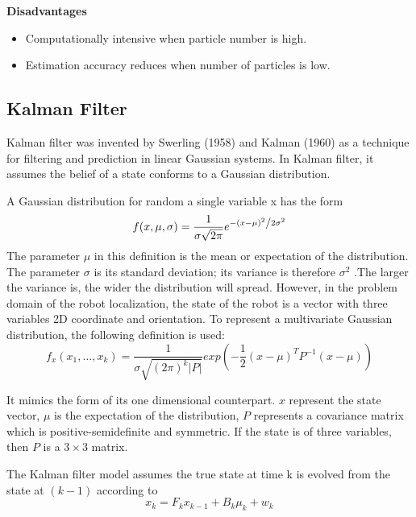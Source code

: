 \noindent\textbf{Disadvantages}

\begin{itemize}
  \item  Computationally intensive when particle number is high.
  \item  Estimation accuracy reduces when number of particles is low.
\end{itemize}


\subsection{Kalman Filter}\label{sub:kalman}
Kalman filter was invented by Swerling (1958) and Kalman (1960) as a technique for filtering and prediction in linear Gaussian systems. In Kalman filter, it assumes the belief of a state conforms to a Gaussian distribution.

A Gaussian distribution for random a single variable x has the form
$$f(x,\mu,\sigma) = \frac{1}{{\sigma \sqrt {2\pi } }}e^{{{ - \left( {x - \mu } \right)^2 } \mathord{\left/ {\vphantom {{ - \left( {x - \mu } \right)^2 } {2\sigma ^2 }}} \right. \kern-\nulldelimiterspace} {2\sigma ^2 }}}$$
The parameter $\mu$ in this definition is the mean or expectation of the distribution. The parameter $\sigma$ is its standard deviation; its variance is therefore $\sigma ^2$ .The larger the variance is, the wider the distribution will spread. However, in the problem domain of the robot localization, the state of the robot is a vector with three variables 2D coordinate and orientation. To represent a multivariate Gaussian distribution, the following definition is used:
$$f_{x}(x_1,\ldots, x_k) = \frac{1}{\sigma \sqrt {(2\pi)^k|P|}}exp(-\frac{1}{2}(x-\mu)^TP^{-1}(x-\mu))$$

It mimics the form of its one dimensional counterpart. $x$ represent the state vector, $\mu$ is the expectation of the distribution, $P$ represents a covariance matrix which is positive-semidefinite and symmetric. If the state is of three variables, then $P$ is a $3\times3$ matrix.

The Kalman filter model assumes the true state at time k is evolved from the state at $(k-1)$ according to
$$x_k = F_kx_{k-1}+B_k\mu_k+w_k$$

